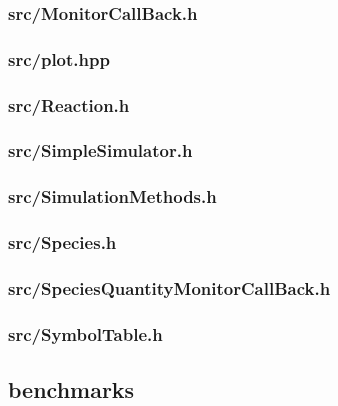 \subsubsection{src/MonitorCallBack.h}

\newpage
\subsubsection{src/plot.hpp}

\newpage
\subsubsection{src/Reaction.h}

\newpage
\subsubsection{src/SimpleSimulator.h}

\newpage
\subsubsection{src/SimulationMethods.h}

\newpage
\subsubsection{src/Species.h}

\newpage
\subsubsection{src/SpeciesQuantityMonitorCallBack.h}

\newpage
\subsubsection{src/SymbolTable.h}

\newpage
\subsection{benchmarks}
